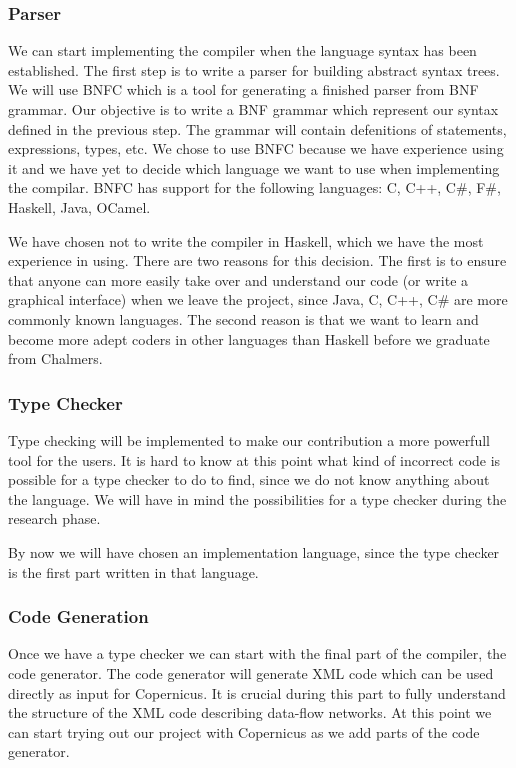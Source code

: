 \documentclass[a4paper]{article}
\begin{document}
\subsubsection{Parser}
We can start implementing the compiler when the language syntax has
been established. The first step is to write a parser for building
abstract syntax trees. We will use BNFC which is a tool for generating
a finished parser from BNF grammar. Our objective is to write a BNF
grammar which represent our syntax defined in the previous step. The
grammar will contain defenitions of statements, expressions, types,
etc. We chose to use BNFC because we have experience using it and we
have yet to decide which language we want to use when implementing the
compilar. BNFC has support for the following languages: C, C++, C\#,
F\#, Haskell, Java, OCamel.

We have chosen not to write the compiler in Haskell, which we have the
most experience in using. There are two reasons for this decision. The
first is to ensure that anyone can more easily take over and
understand our code (or write a graphical interface) when we leave the
project, since Java, C, C++, C\# are more commonly known languages. The
second reason is that we want to learn and become more adept coders in
other languages than Haskell before we graduate from Chalmers.

\subsubsection{Type Checker}
Type checking will be implemented to make our contribution a more
powerfull tool for the users. It is hard to know at this point what
kind of incorrect code is possible for a type checker to do to find,
since we do not know anything about the language. We will have in mind
the possibilities for a type checker during the research phase.

By now we will have chosen an implementation language, since the type
checker is the first part written in that language.

\subsubsection{Code Generation}
Once we have a type checker we can start with the final part of the
compiler, the code generator. The code generator will generate XML
code which can be used directly as input for Copernicus. It is crucial
during this part to fully understand the structure of the XML code
describing data-flow networks. At this point we can start trying out
our project with Copernicus as we add parts of the code generator.
\end{document}
